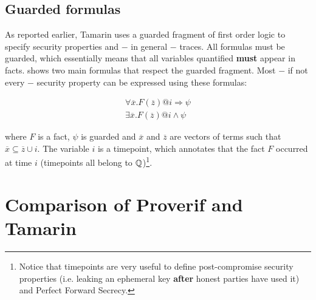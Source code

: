 \subsection{Guarded formulas}
\label{sub:guarded-formulas}

As reported earlier, Tamarin uses a guarded fragment of first order logic to specify security properties and $-$ in general $-$ traces. All formulas must be guarded, which essentially means that all variables quantified \textbf{must} appear in facts.  shows two main formulas that respect the guarded fragment. Most $-$ if not every $-$ security property can be expressed using these formulas:

\begin{equation}
\label{guarded-formulas}
\begin{gathered}
    \forall \overline{x}. F\left(\overline{z}\right) @i \Rightarrow \psi \\
    \exists \overline{x}. F\left(\overline{z}\right) @i \land \psi
\end{gathered}
\end{equation}

where $F$ is a fact, $\psi$ is guarded and $\overline{x}$ and $\overline{z}$ are vectors of terms such that $\overline{x} \subseteq \overline{z} \cup i$.
The variable $i$ is a timepoint, which annotates that the fact $F$ occurred at time $i$ (timepoints all belong to $\mathbb{Q}$)\footnote{Notice that timepoints are very useful to define post-compromise security properties (i.e. leaking an ephemeral key \textbf{after} honest parties have used it) and Perfect Forward Secrecy.}.

\section{Comparison of Proverif and Tamarin}
\label{section:proverif-vs-tamarin}

